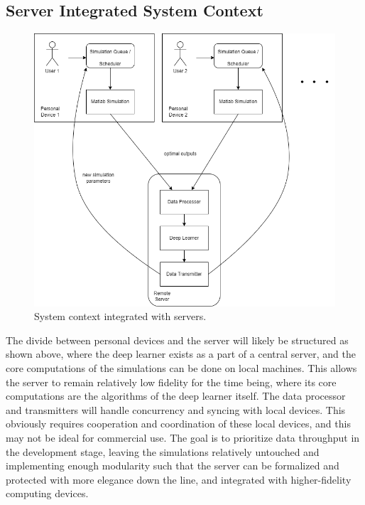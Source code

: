 \documentclass[12pt, titlepage]{article}
\begin{document}
\newpage
\subsection{Server Integrated System Context}

\begin{figure}[htp]
    \centering
    \includegraphics[width=15cm]{images/server_system.png}
    \caption[Server-Int System Contexts 1]{System context integrated with servers.}
    \label{fig:figure4}
\end{figure}

The divide between personal devices and the server will likely be structured as shown above, where the deep learner exists as a part of a central server, and the core computations of the simulations can be done on local machines. This allows the server to remain relatively low fidelity for the time being, where its core computations are the algorithms of the deep learner itself. The data processor and transmitters will handle concurrency and syncing with local devices. This obviously requires cooperation and coordination of these local devices, and this may not be ideal for commercial use. The goal is to prioritize data throughput in the development stage, leaving the simulations relatively untouched and implementing enough modularity such that the server can be formalized and protected with more elegance down the line, and integrated with higher-fidelity computing devices.
\end{document}
